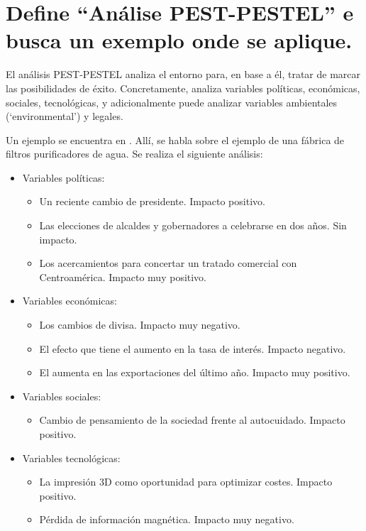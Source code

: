 \documentclass[a4paper]{article}
\begin{document}
\section{Define ``Análise PEST-PESTEL'' e busca un exemplo onde se aplique.}

El análisis PEST-PESTEL analiza el entorno para, en base a él, tratar de marcar las posibilidades de éxito. Concretamente, analiza variables políticas, económicas, sociales, tecnológicas, y adicionalmente puede analizar variables ambientales (`environmental') y legales.

Un ejemplo se encuentra en \cite{RefWorks:doc:602fb2058f0825dac8eafc64}. Allí, se habla sobre el ejemplo de una fábrica de filtros purificadores de agua. Se realiza el siguiente análisis:

\begin{itemize}
    \item Variables políticas:
    \begin{itemize}
        \item Un reciente cambio de presidente. Impacto positivo.
        \item Las elecciones de alcaldes y gobernadores a celebrarse en dos años. Sin impacto.
        \item Los acercamientos para concertar un tratado comercial con Centroamérica. Impacto muy positivo.
    \end{itemize}
    \item Variables económicas:
    \begin{itemize}
        \item Los cambios de divisa. Impacto muy negativo.
        \item El efecto que tiene el aumento en la tasa de interés. Impacto negativo.
        \item El aumenta en las exportaciones del último año. Impacto muy positivo.
    \end{itemize}
    \item Variables sociales:
    \begin{itemize}
        \item Cambio de pensamiento de la sociedad frente al autocuidado. Impacto positivo.
    \end{itemize}
    \item Variables tecnológicas:
    \begin{itemize}
        \item La impresión 3D como oportunidad para optimizar costes. Impacto positivo.
        \item Pérdida de información magnética. Impacto muy negativo.

\end{itemize}
\end{itemize}
\end{document}
